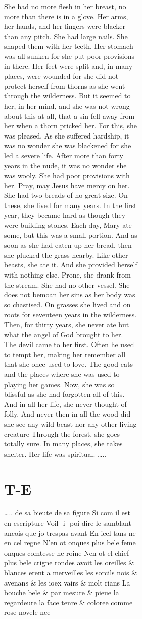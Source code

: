 \documentclass[
  letterpaper,
  DIV=11,
  numbers=noendperiod,
  oneside]{scrreprt}
\begin{document}
\begin{figure}
\begin{figure}
\begin{figure}
\begin{minipage}{0.20\linewidth}
She had {no more} flesh in her breast, {no more} than there is in a
glove. Her arms, her hands, and her fingers were {blacker than any
pitch.} She had large nails. She shaped them with her teeth. Her stomach
was all sunken for she put poor provisions in there. Her feet were split
and, in many places, were wounded for she {did not} protect herself from
thorns as she went through the wilderness. But it seemed to her, in her
mind, and she was {not} wrong about this {at all}, that a sin fell away
from her when a thorn pricked her. For this, she was pleased. As she
suffered hardship, {it was no wonder} she was {blackened} for she led a
severe life. After more than forty years in the nude, {it was no wonder}
she was wooly. She had poor provisions with her. Pray, may Jesus have
mercy on her. She had two breads of {no great size}. On these, she lived
for many years. In the first year, they became hard as though they were
building stones. Each day, Mary ate some, but this was a small portion.
And as soon as she had eaten up her bread, then she plucked the grass
nearby. Like other beasts, she ate it. And she provided herself with
{nothing else.} Prone, she drank from the stream. She had {no} other
vessel. She {does not} bemoan her sins as her body was so chastised. On
grasses she lived and on roots for seventeen years in the wilderness.
Then, for thirty years, she {never} ate but what the angel of God
brought to her. The devil came to her first. Often he used to tempt her,
making her remember all that she once used to love. The good eats and
the places where she was used to playing her games. Now, she was so
blissful as she had forgotten all of this. And in all her life, she
{never} thought of folly. And {never} then in all the wood did she see
{any} wild beast {nor any} other living creature Through the forest, she
goes totally sure. In many places, she takes shelter. Her life was
spiritual. \ldots..

\end{minipage}%
%
\begin{minipage}{0.20\linewidth}

\section{T-E}\label{t-e-1}

\ldots.. de sa bieute de sa figure Si com il est en escripture Voil -i-
poi dire le samblant ancois que jo trespas avant En icel tans ne en cel
regne {N'}en ot {onques} plus bele feme {onques} comtesse {ne} roine
{Nen} ot el chief plus bele crigne rondes avoit les oreilles \&
{blances} erent a merveilles les sorcils {nois} \& avenans \& les ioex
{vairs} \& molt rians La bouche bele \& par mesure \& pieue la
regardeure la face tenre \& {coloree} {comme rose novele nee}


\end{minipage}
\end{figure}
\end{figure}
\end{figure}
\end{document}
